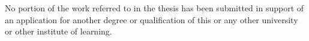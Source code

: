 No portion of the work referred to in the thesis has been submitted in support of an application for another degree or qualification of this or any other university or other institute of learning.